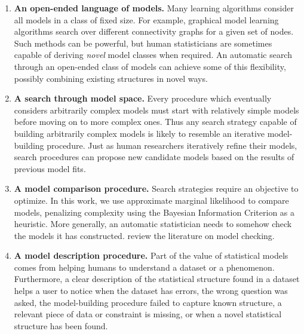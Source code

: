 \begin{enumerate}
\item {\bf An open-ended language of models.}
Many learning algorithms consider all models in a class of fixed size.
For example, graphical model learning algorithms \citep{Friedman03,Eaton07_uai} search over different connectivity graphs for a given set of nodes.
Such methods can be powerful, but human statisticians are sometimes capable of deriving \emph{novel} model classes when required.
An automatic search through an open-ended class of models can achieve some of this flexibility, %
possibly combining existing structures in novel ways.

\item {\bf A search through model space.}
Every procedure which eventually considers arbitrarily complex models must start with relatively simple models before moving on to more complex ones.
Thus any search strategy capable of building arbitrarily complex models is likely to resemble an iterative model-building procedure.
Just as human researchers iteratively refine their models, search procedures can propose new candidate models based on the results of previous model fits.

\item {\bf A model comparison procedure.}
Search strategies require an objective to optimize.
In this work, we use approximate marginal likelihood to compare models, penalizing complexity using the Bayesian Information Criterion as a heuristic.
More generally, an automatic statistician needs to somehow check the models it has constructed.
\citet{gelman2012philosophy} review the literature on model checking.

\item {\bf A model description procedure.}
Part of the value of statistical models comes from helping humans to understand a dataset or a phenomenon.
Furthermore, a clear description of the statistical structure found in a dataset helps a user to notice when the dataset has errors, the wrong question was asked, the model-building procedure failed to capture known structure, a relevant piece of data or constraint is missing, or when a novel statistical structure has been found.
\end{enumerate}

